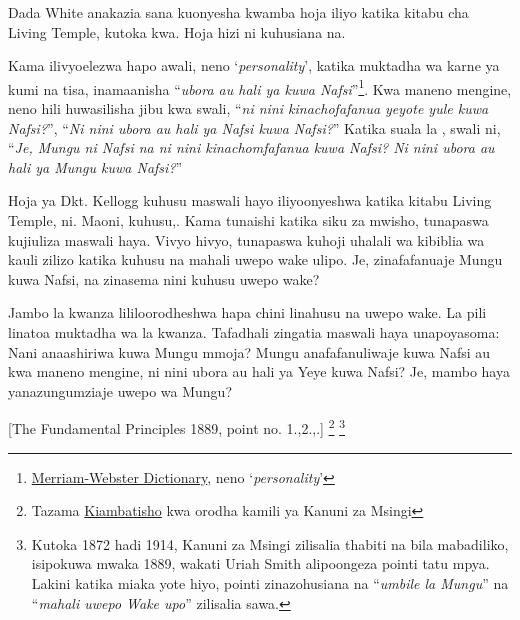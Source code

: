 Dada White anakazia sana kuonyesha kwamba hoja iliyo katika kitabu cha Living Temple, kutoka kwa. Hoja hizi ni kuhusiana na.


Kama ilivyoelezwa hapo awali, neno ‘\textit{personality}’, katika muktadha wa karne ya kumi na tisa, inamaanisha “\textit{ubora au hali ya kuwa Nafsi}”\footnote{\href{https://www.merriam-webster.com/dictionary/personality}{Merriam-Webster Dictionary}, neno ‘\textit{personality}’}. Kwa maneno mengine, neno hili huwasilisha jibu kwa swali, “\textit{ni nini kinachofafanua yeyote yule kuwa Nafsi?}”, “\textit{Ni nini ubora au hali ya Nafsi kuwa Nafsi?}” Katika suala la , swali ni, “\textit{Je, Mungu ni Nafsi na ni nini kinachomfafanua kuwa Nafsi? Ni nini ubora au hali ya Mungu kuwa Nafsi?}”


Hoja ya Dkt. Kellogg kuhusu maswali hayo iliyoonyeshwa katika kitabu Living Temple, ni. Maoni, kuhusu,. Kama tunaishi katika siku za mwisho, tunapaswa kujiuliza maswali haya. Vivyo hivyo, tunapaswa kuhoji uhalali wa kibiblia wa kauli zilizo katika  kuhusu  na mahali uwepo wake ulipo. Je,  zinafafanuaje Mungu kuwa Nafsi, na zinasema nini kuhusu uwepo wake?


Jambo la kwanza lililoorodheshwa hapa chini linahusu  na uwepo wake. La pili linatoa muktadha wa la kwanza. Tafadhali zingatia maswali haya unapoyasoma: Nani anaashiriwa kuwa Mungu mmoja? Mungu anafafanuliwaje kuwa Nafsi au kwa maneno mengine, ni nini ubora au hali ya Yeye kuwa Nafsi? Je, mambo haya yanazungumziaje uwepo wa Mungu?




[The Fundamental Principles 1889, point no. 1.,2.,.] \footnote{Tazama \hyperref[chap:appendix]{Kiambatisho} kwa orodha kamili ya Kanuni za Msingi} \footnote{Kutoka 1872 hadi 1914, Kanuni za Msingi zilisalia thabiti na bila mabadiliko, isipokuwa mwaka 1889, wakati Uriah Smith alipoongeza pointi tatu mpya. Lakini katika miaka yote hiyo, pointi zinazohusiana na “\textit{umbile la Mungu}” na “\textit{mahali uwepo Wake upo}” zilisalia sawa.}


